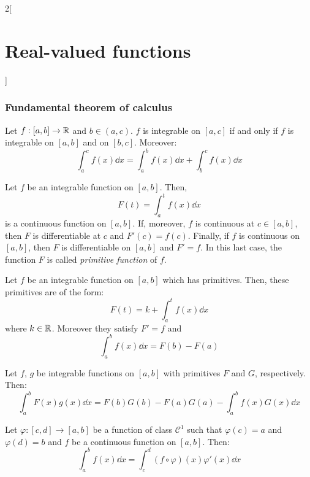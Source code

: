 \documentclass[../../../main_math.tex]{subfiles}
\begin{document}
\begin{multicols}{2}[\section{Real-valued functions}]
  \subsubsection{Fundamental theorem of calculus}
  \begin{proposition}
    Let $f:[a,b]\rightarrow\mathbb{R}$ and $b\in(a,c)$. $f$ is integrable on $[a,c]$ if and only if $f$ is integrable on $[a,b]$ and on $[b,c]$. Moreover: $$\int_a^cf(x)\dd{x}=\int_a^bf(x)\dd{x}+\int_b^cf(x)\dd{x}$$
  \end{proposition}
  \begin{theorem}
    Let $f$ be an integrable function on $[a,b]$. Then, $$F(t)=\int_a^tf(x)\dd{x}$$ is a continuous function on $[a,b]$. If, moreover, $f$ is continuous at $c\in[a,b]$, then $F$ is differentiable at $c$ and $F'(c)=f(c)$. Finally, if $f$ is continuous on $[a,b]$, then $F$ is differentiable on $[a,b]$ and $F'=f$. In this last case, the function $F$ is called \emph{primitive function} of $f$.
  \end{theorem}
  \begin{theorem}
    Let $f$ be an integrable function on $[a,b]$ which has primitives. Then, these primitives are of the form: $$F(t)=k+\int_a^tf(x)\dd{x}$$ where $k\in\mathbb{R}$. Moreover they satisfy $F'=f$ and $$\int_a^bf(x)\dd{x}=F(b)-F(a)$$
  \end{theorem}
  \begin{corollary}
    Let $f$, $g$ be integrable functions on $[a,b]$ with primitives $F$ and $G$, respectively. Then: $$\int_a^bF(x)g(x)\dd{x}=F(b)G(b)-F(a)G(a)-\int_a^bf(x)G(x)\dd{x}$$
  \end{corollary}
  \begin{corollary}
    Let $\varphi:[c,d]\rightarrow[a,b]$ be a function of class $\mathcal{C}^1$ such that $\varphi(c)=a$ and $\varphi(d)=b$ and $f$ be a continuous function on $[a,b]$. Then: $$\int_a^bf(x)\dd{x}=\int_c^d(f\circ\varphi)(x)\varphi'(x)\dd{x}$$
  \end{corollary}

\end{multicols}
\end{document}

